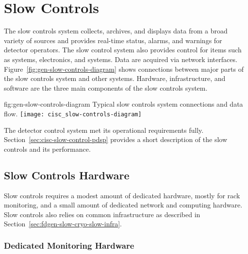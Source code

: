 \section{Slow Controls}

The slow controls system collects, archives, and displays data from
a broad variety of sources and provides real-time status, alarms, and warnings for detector operators. The slow control system also provides control for %
items such as  systems,  electronics, and  systems. Data are acquired via network interfaces.  Figure~\ref{fig:gen-slow-controls-diagram} shows connections between major parts of the slow controls system and other systems. Hardware, infrastructure, and software are the three main components of the slow controls system. %

\begin{dunefigure}{fig:gen-slow-controls-diagram}
{Typical slow controls system connections and data flow.}
\texttt{[image: cisc\_slow-controls-diagram]}
\end{dunefigure}

The  detector control system\cite{pdspdcs_proc}  met its operational requirements fully. %
Section~\ref{sec:cisc-slow-control-pdsp} provides a short description of the  slow controls and its performance.

 \subsection{Slow Controls Hardware}
\label{sec:fdgen-slow-cryo-hdwr}

Slow controls requires a modest amount of dedicated hardware, mostly for rack monitoring,  %
and a small amount of dedicated network and
computing hardware. %
Slow controls also relies on common
infrastructure as described in
Section~\ref{sec:fdgen-slow-cryo-slow-infra}.

\subsubsection{Dedicated Monitoring Hardware}

